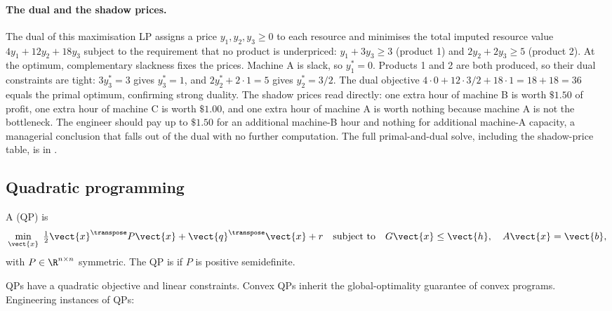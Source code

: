

\paragraph{The dual and the shadow prices.}
The dual of this maximisation LP assigns a price $y_{1}, y_{2},
y_{3} \geq 0$ to each resource and minimises the total imputed
resource value $4 y_{1} + 12 y_{2} + 18 y_{3}$ subject to the
requirement that no product is underpriced: $y_{1} + 3 y_{3} \geq
3$ (product 1) and $2 y_{2} + 2 y_{3} \geq 5$ (product 2). At the
optimum, complementary slackness fixes the prices. Machine A is
slack, so $y_{1}^{*} = 0$. Products 1 and 2 are both produced, so
their dual constraints are tight: $3 y_{3}^{*} = 3$ gives
$y_{3}^{*} = 1$, and $2 y_{2}^{*} + 2 \cdot 1 = 5$ gives
$y_{2}^{*} = 3/2$. The dual objective $4 \cdot 0 + 12 \cdot 3/2 +
18 \cdot 1 = 18 + 18 = 36$ equals the primal optimum, confirming
strong duality. The shadow prices read directly: one extra hour
of machine B is worth $\$1.50$ of profit, one extra hour of
machine C is worth $\$1.00$, and one extra hour of machine A is
worth nothing because machine A is not the bottleneck. The
engineer should pay up to $\$1.50$ for an additional machine-B
hour and nothing for additional machine-A capacity, a managerial
conclusion that falls out of the dual with no further computation.
The full primal-and-dual solve, including the shadow-price table,
is in
.

\subsection{Quadratic programming}

\begin{definition}
A  (QP) is
\[
\min_{\vect{x}} \; \tfrac{1}{2} \vect{x}^{\transpose} P \vect{x}
+ \vect{q}^{\transpose} \vect{x} + r
\quad \text{subject to} \quad
G \vect{x} \leq \vect{h}, \quad A \vect{x} = \vect{b},
\]
with $P \in \R^{n \times n}$ symmetric. The QP is 
if $P$ is positive semidefinite.
\end{definition}

QPs have a quadratic objective and linear constraints. Convex QPs
inherit the global-optimality guarantee of convex programs.
Engineering instances of QPs:

